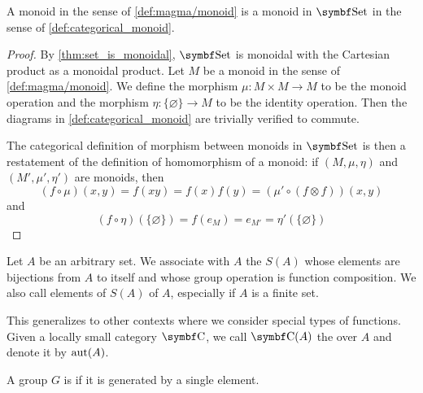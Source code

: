 \begin{proposition}\label{thm:monoids_are_monoids_in_set}
  A monoid in the sense of \cref{def:magma/monoid} is a monoid in \( \Cat{Set} \) in the sense of \cref{def:categorical_monoid}.
\end{proposition}
\begin{proof}
  By \cref{thm:set_is_monoidal}, \( \Cat{Set} \) is monoidal with the Cartesian product as a monoidal product. Let \( M \) be a monoid in the sense of \cref{def:magma/monoid}. We define the morphism \( \mu: M \times M \to M \) to be the monoid operation and the morphism \( \eta: \{ \varnothing \} \to M \) to be the identity operation. Then the diagrams in \cref{def:categorical_monoid} are trivially verified to commute.

  The categorical definition of morphism between monoids in \( \Cat{Set} \) is then a restatement of the definition of homomorphism of a monoid: if \( (M, \mu, \eta) \) and \( (M', \mu', \eta') \) are monoids, then
  \begin{equation*}
    (f \circ \mu)(x, y)
    =
    f(xy)
    =
    f(x) f(y)
    =
    (\mu' \circ (f \otimes f))(x, y)
  \end{equation*}
  and
  \begin{equation*}
    (f \circ \eta)(\{ \varnothing \})
    =
    f(e_M)
    =
    e_{M'}
    =
    \eta'(\{ \varnothing \})
  \end{equation*}
\end{proof}

\begin{definition}\label{def:symmetric_group}
  Let \( A \) be an arbitrary set. We associate with \( A \) the  \( S(A) \) whose elements are bijections from \( A \) to itself and whose group operation is function composition. We also call elements of \( S(A) \)  of \( A \), especially if \( A \) is a finite set.

  This generalizes to other contexts where we consider special types of functions. Given a locally small category \( \Cat{C} \), we call \( \Cat{C}(A) \) the  over \( A \) and denote it by \( \operatorname{aut}(A) \).
\end{definition}

\begin{definition}\label{def:cyclic_group}
  A group \( G \) is  if it is generated by a single element.
\end{definition}

